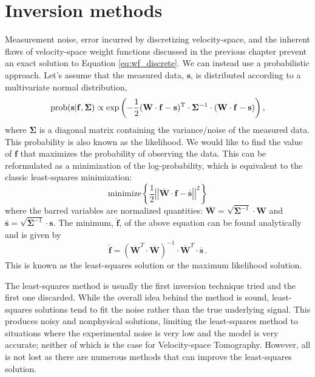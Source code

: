 \section{Inversion methods}\label{sec:methods}
Measurement noise, error incurred by discretizing velocity-space, and the inherent flaws of velocity-space weight functions discussed in the previous chapter prevent an exact solution to Equation \ref{eq:wf_discrete}. We can instead use a probabilistic approach. Let's assume that the measured data, $\mathbf{s}$, is distributed according to a multivariate normal distribution,
\begin{equation}\label{eq:likelihood}
    \rm{prob}(\mathbf{s}|\mathbf{f},\mathbf{\Sigma}) \propto \exp{\left(-\frac{1}{2} (\mathbf{W}\cdot\mathbf{f} - \mathbf{s})^T \cdot \mathbf{\Sigma}^{-1} \cdot (\mathbf{W}\cdot\mathbf{f} - \mathbf{s})\right)}\,,
\end{equation}
where $\mathbf{\Sigma}$ is a diagonal matrix containing the variance/noise of the measured data. This probability is also known as the likelihood. We would like to find the value of $\mathbf{f}$ that maximizes the probability of observing the data. This can be reformulated as a minimization of the log-probability, which is equivalent to the classic least-squares minimization:
\begin{equation}\label{eq:least_squares}
    \mathrm{minimize} \left \lbrace \frac{1}{2}\left|\left| \mathbf{\overline{W}}\cdot\mathbf{f} - \mathbf{\overline{s}}\right|\right|^2 \right \rbrace 
\end{equation}
where the barred variables are normalized quantities: $\mathbf{\overline{W}} = \sqrt{\mathbf{\Sigma}^{-1}}\cdot\mathbf{W}$ and $\mathbf{\overline{s}}=\sqrt{\mathbf{\Sigma}^{-1}}\cdot\mathbf{s}$.
The minimum, $\mathbf{\hat{f}}$, of the above equation can be found analytically and is given by
\begin{equation}\label{eq:least_squares_solution}
    \mathbf{\hat{f}} = \left(\mathbf{\overline{W}}^T\cdot\mathbf{\overline{W}}\right)^{-1}\cdot\mathbf{\overline{W}}^T \cdot \mathbf{\overline{s}}\,.
\end{equation}
This is known as the least-squares solution or the maximum likelihood solution.

The least-squares method is usually the first inversion technique tried and the first one discarded. While the overall idea behind the method is sound, least-squares solutions tend to fit the noise rather than the true underlying signal. This produces noisy and nonphysical solutions, limiting the least-squares method to situations where the experimental noise is very low and the model is very accurate; neither of which is the case for Velocity-space Tomography.
However, all is not lost as there are numerous methods that can improve the least-squares solution.   

